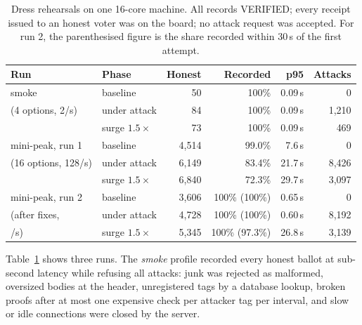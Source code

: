 \documentclass[runningheads]{llncs}
\begin{document}
\begin{table}[t]
\caption{Dress rehearsals on one 16-core machine. All records VERIFIED; every receipt issued to an honest voter was on the board; no attack request was accepted. For run 2, the parenthesised figure is the share recorded within 30\,s of the first attempt.}\label{tab:rehearsal}
\centering
\small
\begin{tabular}{@{}llrrrr@{}}
\toprule
Run & Phase & Honest & Recorded & p95 & Attacks \\
\midrule
smoke & baseline & 50 & 100\% & 0.09\,s & 0 \\
(4 options, 2/s) & under attack & 84 & 100\% & 0.09\,s & 1,210 \\
 & surge $1.5\times$ & 73 & 100\% & 0.09\,s & 469 \\
\midrule
mini-peak, run 1 & baseline & 4,514 & 99.0\% & 7.6\,s & 0 \\
(16 options, 128/s) & under attack & 6,149 & 83.4\% & 21.7\,s & 8,426 \\
 & surge $1.5\times$ & 6,840 & 72.3\% & 29.7\,s & 3,097 \\
\midrule
mini-peak, run 2 & baseline & 3,606 & 100\% (100\%) & 0.65\,s & 0 \\
(after fixes, & under attack & 4,728 & 100\% (100\%) & 0.60\,s & 8,192 \\
\quad 99.7/s) & surge $1.5\times$ & 5,345 & 100\% (97.3\%) & 26.8\,s & 3,139 \\
\bottomrule
\end{tabular}
\end{table}

Table~\ref{tab:rehearsal} shows three runs. The \emph{smoke} profile recorded every honest ballot at sub-second latency while refusing all attacks: junk was rejected as malformed, oversized bodies at the header, unregistered tags by a database lookup, broken proofs after at most one expensive check per attacker tag per interval, and slow or idle connections were closed by the server.
\end{document}
